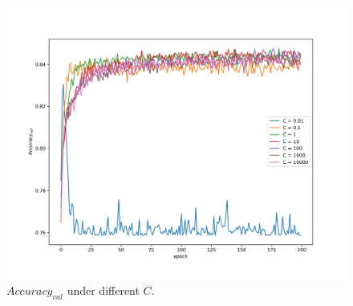 \documentclass[journal, a4paper]{IEEEtran}
\begin{document}
\begin{figure}[!hbt]
	\begin{center}
		\includegraphics[width=\columnwidth]{c_val_acc}
		\caption{$Accuracy_{val}$ under different $C$.}
		\label{fig:C_acc}
	\end{center}
\end{figure} \par
\end{document}
